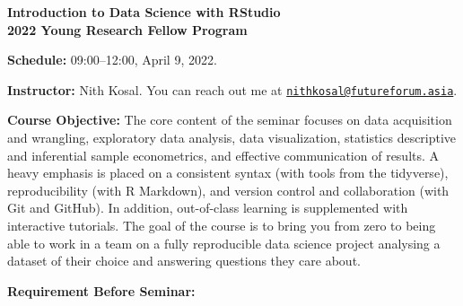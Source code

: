 \documentclass[11pt,a4paper]{letter}
\begin{document}
\begin{center}
	\LARGE\textbf{ Introduction to Data Science with RStudio \\
	\Large 2022 Young Research Fellow Program}
\end{center}

  \textbf{Schedule:} 09:00--12:00, April 9, 2022. 
  
   \textbf{Instructor:} Nith Kosal. You can reach out me at \href{mailto:nithkosal@futureforum.asia}{\texttt{nithkosal@futureforum.asia}}. 
 
  \textbf{Course Objective:} The core content of the seminar focuses on data acquisition and wrangling, exploratory data analysis, data visualization, statistics descriptive and inferential sample econometrics, and effective communication of results. A heavy emphasis is placed on a consistent syntax (with tools from the tidyverse), reproducibility (with R Markdown), and version control and collaboration (with Git and GitHub). In addition, out-of-class learning is supplemented with interactive tutorials. The goal of the course is to bring you from zero to being able to work in a team on a fully reproducible data science project analysing a dataset of their choice and answering questions they care about.
 
\textbf{Requirement Before Seminar:}
\end{document}
